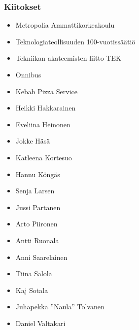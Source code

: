 \newpage

\subsubsection*{Kiitokset}
\begin{itemize}
\item Metropolia Ammattikorkeakoulu %
\item Teknologiateollisuuden 100-vuotissäätiö %
\item Tekniikan akateemisten liitto TEK
\item Onnibus
\item Kebab Pizza Service
\item Heikki Hakkarainen
\item Eveliina Heinonen
\item Jokke Häsä
\item Katleena Kortesuo
\item Hannu Köngäs
\item Senja Larsen
\item Jussi Partanen
\item Arto Piironen
\item Antti Ruonala
\item Anni Saarelainen
\item Tiina Salola
\item Kaj Sotala
\item Juhapekka ''Naula'' Tolvanen
\item Daniel Valtakari
\end{itemize}
